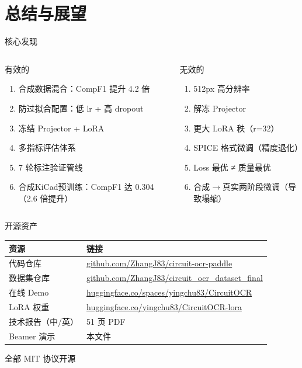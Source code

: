 \documentclass[10pt,aspectratio=169,table]{beamer}
\begin{document}
\section{总结与展望}

\begin{frame}{核心发现}
  \begin{columns}[T]
      \begin{block}{有效的}
        \footnotesize
        \begin{enumerate}
          \item 合成数据混合：CompF1 提升 4.2 倍
          \item 防过拟合配置：低 lr + 高 dropout
          \item 冻结 Projector + LoRA
          \item 多指标评估体系
          \item 7 轮标注验证管线
          \item 合成KiCad预训练：CompF1 达 0.304（2.6 倍提升）
        \end{enumerate}
      \end{block}
      \begin{block}{无效的}
        \footnotesize
        \begin{enumerate}
          \item 512px 高分辨率
          \item 解冻 Projector
          \item 更大 LoRA 秩（r=32）
          \item SPICE 格式微调（精度退化）
          \item Loss 最优 ≠ 质量最优
          \item 合成$\to$真实两阶段微调（导致塌缩）
        \end{enumerate}
      \end{block}
  \end{columns}
\end{frame}

\begin{frame}{开源资产}
  \begin{table}
    \centering
    \footnotesize
    \begin{tabular}{ll}
      \toprule
      \textbf{资源} & \textbf{链接} \\
      \midrule
      代码仓库 & \url{github.com/ZhangJ83/circuit-ocr-paddle} \\
      数据集仓库 & \url{github.com/ZhangJ83/circuit_ocr_dataset_final} \\
      在线 Demo & \url{huggingface.co/spaces/yingchu83/CircuitOCR} \\
      LoRA 权重 & \url{huggingface.co/yingchu83/CircuitOCR-lora} \\
      技术报告（中/英）& 51 页 PDF \\
      Beamer 演示 & 本文件 \\
      \bottomrule
    \end{tabular}
  \end{table}
  \begin{center}
    \footnotesize 全部 MIT 协议开源
  \end{center}
\end{frame}
\end{document}

